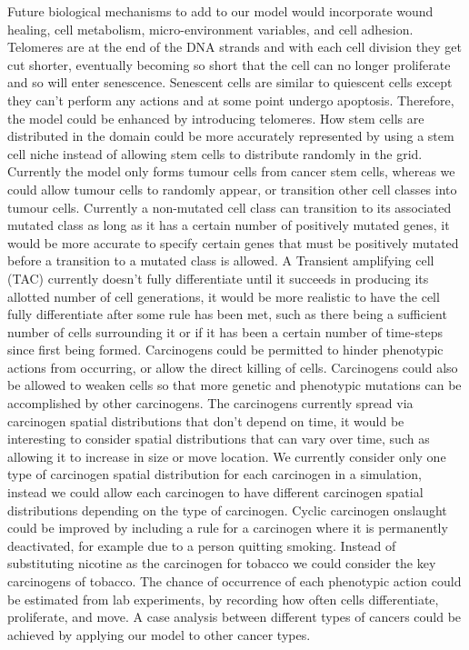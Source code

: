 \documentclass[\main/thesis.tex]{subfiles}
\begin{document}
Future biological mechanisms to add to our model would incorporate wound healing, cell metabolism, micro-environment variables, and cell adhesion. \newline Telomeres are at the end of the DNA strands and with each cell division they get cut shorter, eventually becoming so short that the cell can no longer proliferate and so will enter senescence. Senescent cells are similar to quiescent cells except they can’t perform any actions and at some point undergo apoptosis. Therefore, the model could be enhanced by introducing telomeres. How stem cells are distributed in the domain could be more accurately represented by using a stem cell niche instead of allowing stem cells to distribute randomly in the grid. Currently the model only forms tumour cells from cancer stem cells, whereas we could allow tumour cells to randomly appear, or transition other cell classes into tumour cells. Currently a non-mutated cell class can transition to its associated mutated class as long as it has a certain number of positively mutated genes, it would be more accurate to specify certain genes that must be positively mutated before a transition to a mutated class is allowed. A Transient amplifying cell (TAC) currently doesn't fully differentiate until it succeeds in producing its allotted number of cell generations, it would be more realistic to have the cell fully differentiate after some rule has been met, such as there being a sufficient number of cells surrounding it or if it has been a certain number of time-steps since first being formed. Carcinogens could be permitted to hinder phenotypic actions from occurring, or allow the direct killing of cells. Carcinogens could also be allowed to weaken cells so that more genetic and phenotypic mutations can be accomplished by other carcinogens. The carcinogens currently spread via carcinogen spatial distributions that don't depend on time, it would be interesting to consider spatial distributions that can vary over time, such as allowing it to increase in size or move location. We currently consider only one type of carcinogen spatial distribution for each carcinogen in a simulation, instead we could allow each carcinogen to have different carcinogen spatial distributions depending on the type of carcinogen. Cyclic carcinogen onslaught could be improved by including a rule for a carcinogen where it is permanently deactivated, for example due to a person quitting smoking. Instead of substituting nicotine as the carcinogen for tobacco we could consider the key carcinogens of tobacco. The chance of occurrence of each phenotypic action could be estimated from lab experiments, by recording how often cells differentiate, proliferate, and move. A case analysis between different types of cancers could be achieved by applying our model to other cancer types. 
\end{document}
